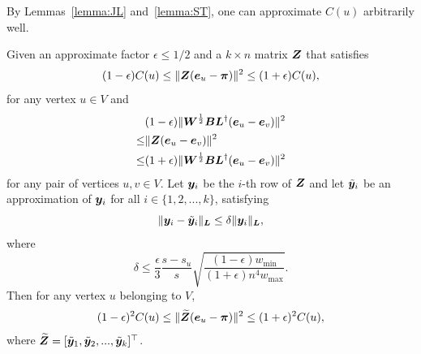 \documentclass[journal]{IEEEtran}
\begin{document}
By Lemmas~\ref{lemma:JL} and~\ref{lemma:ST},  one can  approximate  \(C(u)\) arbitrarily well.
\begin{lemma}\label{lem:error1}
    Given an approximate factor \(\epsilon \le 1/2\) and a \(k\times n\) matrix \(\boldsymbol{Z}\) that satisfies
    \[
        (1-\epsilon) C(u)
        \leq
        \|\boldsymbol{Z} (\boldsymbol{e}_{u} - \boldsymbol{\pi})\|^{2}
        \leq
        (1+\epsilon)  C(u),
    \]
    for any vertex \(u\in V\) and
    \begin{align*}
             & (1-\epsilon) \|\boldsymbol{W}^{\frac{1}{2}} \boldsymbol{B} \boldsymbol{L}^{\dagger} (\boldsymbol{e}_u-\boldsymbol{e}_v)\|^2 \\
        \leq &
        \|\boldsymbol{Z} (\boldsymbol{e}_u - \boldsymbol{e}_v)\|^2                                                      \\
        \leq &
        (1+\epsilon) \|\boldsymbol{W}^{\frac{1}{2}} \boldsymbol{B} \boldsymbol{L}^{\dagger} (\boldsymbol{e}_u-\boldsymbol{e}_v)\|^2
    \end{align*}
    for any pair of vertices \(u,v \in V\).
    Let \(\boldsymbol{y}_i\) be the \(i\)-th row of \(\boldsymbol{Z}\) and let \(\tilde{\boldsymbol{y}}_i\) be an approximation of \(\boldsymbol{y}_i\) for all \(i \in \{1,2,...,k\}\), satisfying
    \begin{equation}\label{EE13} \|\boldsymbol{y}_i-\tilde{\boldsymbol{y}}_i\|_{\boldsymbol{L}}\le\delta
        \|\boldsymbol{y}_{i}\|_{\boldsymbol{L}},
    \end{equation}
    where
    \begin{equation}\label{EE14}
        \delta \leq  \frac{\epsilon }{3} \frac{s-s_u}{s}
        \sqrt{\frac{(1-\epsilon) w_{\min}}{(1+\epsilon) n^4 w_{\max}}}.
    \end{equation}
    Then for any vertex \(u\) belonging to \(V\),
    \begin{align}
        \label{EE15}
        (1 - \epsilon)^2  C(u)
        \leq
        \|\widetilde{\boldsymbol{Z}}  (\boldsymbol{e}_{u} - \boldsymbol{\pi})\|^2
        \leq
        (1 + \epsilon)^2  C(u),
    \end{align}
    where \(\widetilde{\boldsymbol{Z}} = [\tilde{\boldsymbol{y}}_1, \tilde{\boldsymbol{y}}_2, ..., \tilde{\boldsymbol{y}}_k]^\top\).
\end{lemma}
\end{document}
